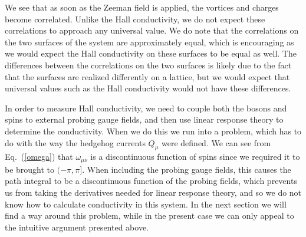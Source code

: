 We see that as soon as the Zeeman field is applied, the vortices and charges become correlated. Unlike the Hall conductivity, we do not expect these correlations to approach any universal value. We do note that the correlations on the two surfaces of the system are approximately equal, which is encouraging as we would expect the Hall conductivity on these surfaces to be equal as well. The differences between the correlations on the two surfaces is likely due to the fact that the surfaces are realized differently on a lattice, but we would expect that universal values such as the Hall conductivity would not have these differences.

In order to measure Hall conductivity, we need to couple both the bosons and spins to external probing gauge fields, and then use linear response theory to determine the conductivity. When we do this we run into a problem, which has to do with the way the hedgehog currents $Q_\mu$ were defined. We can see from Eq.~(\ref{omega}) that $\omega_{\mu\nu}$ is a discontinuous function of spins since we required it to be brought to $(-\pi, \pi]$. When including the probing gauge fields, this causes the path integral to be a discontinuous function of the probing fields, which prevents us from taking the derivatives needed for linear response theory, and so we do not know how to calculate conductivity in this system. In the next section we will find a way around this problem, while in the present case we can only appeal to the intuitive argument presented above.


